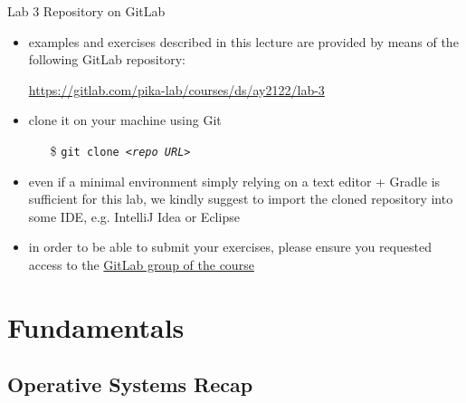 \documentclass{beamer}\mode<presentation>{\usetheme{AMSBolognaFC}}
\newcommand{\labN}{3}
\newcommand{\labGroup}{https://gitlab.com/pika-lab/courses/ds/ay2122}
\newcommand{\labRepo}{\labGroup/lab-\labN}
\begin{document}
\begin{frame}[c]{Lab \labN{} Repository on GitLab}

	\begin{itemize}
		\item examples and exercises described in this lecture are provided by means of the following GitLab repository:
		\begin{center}
			\url{\labRepo}
		\end{center}

		\vfill

		\item clone it on your machine using Git
		\begin{itemize}
		    \item[\$] \texttt{git clone \textit{<repo URL>}}
		\end{itemize}

		\vfill

		\item even if a minimal environment simply relying on a text editor + Gradle is sufficient for this lab, we kindly suggest to import the cloned repository into some IDE, e.g. IntelliJ Idea or Eclipse

		\vfill

		\item in order to be able to submit your exercises, please ensure you requested access to the \href{\labGroup}{GitLab group of the course}
	\end{itemize}

\end{frame}

\section{Fundamentals}

\subsection{Operative Systems Recap}
\end{document}
